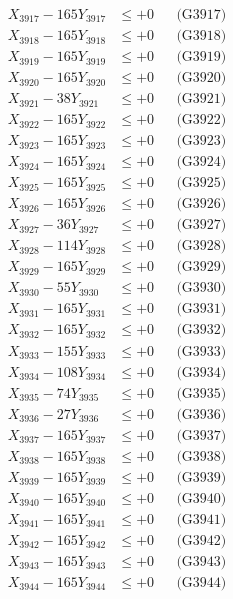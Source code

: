 \documentclass[a4paper,10pt]{article}
\begin{document}
{\begin{align}
X_{3917} - 165Y_{3917} &\leq +0 && \text{(G3917)} \\
X_{3918} - 165Y_{3918} &\leq +0 && \text{(G3918)} \\
X_{3919} - 165Y_{3919} &\leq +0 && \text{(G3919)} \\
X_{3920} - 165Y_{3920} &\leq +0 && \text{(G3920)} \\
\allowbreak
X_{3921} - 38Y_{3921} &\leq +0 && \text{(G3921)} \\
X_{3922} - 165Y_{3922} &\leq +0 && \text{(G3922)} \\
X_{3923} - 165Y_{3923} &\leq +0 && \text{(G3923)} \\
X_{3924} - 165Y_{3924} &\leq +0 && \text{(G3924)} \\
X_{3925} - 165Y_{3925} &\leq +0 && \text{(G3925)} \\
X_{3926} - 165Y_{3926} &\leq +0 && \text{(G3926)} \\
X_{3927} - 36Y_{3927} &\leq +0 && \text{(G3927)} \\
X_{3928} - 114Y_{3928} &\leq +0 && \text{(G3928)} \\
X_{3929} - 165Y_{3929} &\leq +0 && \text{(G3929)} \\
X_{3930} - 55Y_{3930} &\leq +0 && \text{(G3930)} \\
\allowbreak
X_{3931} - 165Y_{3931} &\leq +0 && \text{(G3931)} \\
X_{3932} - 165Y_{3932} &\leq +0 && \text{(G3932)} \\
X_{3933} - 155Y_{3933} &\leq +0 && \text{(G3933)} \\
X_{3934} - 108Y_{3934} &\leq +0 && \text{(G3934)} \\
X_{3935} - 74Y_{3935} &\leq +0 && \text{(G3935)} \\
X_{3936} - 27Y_{3936} &\leq +0 && \text{(G3936)} \\
X_{3937} - 165Y_{3937} &\leq +0 && \text{(G3937)} \\
X_{3938} - 165Y_{3938} &\leq +0 && \text{(G3938)} \\
X_{3939} - 165Y_{3939} &\leq +0 && \text{(G3939)} \\
X_{3940} - 165Y_{3940} &\leq +0 && \text{(G3940)} \\
\allowbreak
X_{3941} - 165Y_{3941} &\leq +0 && \text{(G3941)} \\
X_{3942} - 165Y_{3942} &\leq +0 && \text{(G3942)} \\
X_{3943} - 165Y_{3943} &\leq +0 && \text{(G3943)} \\
X_{3944} - 165Y_{3944} &\leq +0 && \text{(G3944)} \\

\end{align}}
\end{document}
